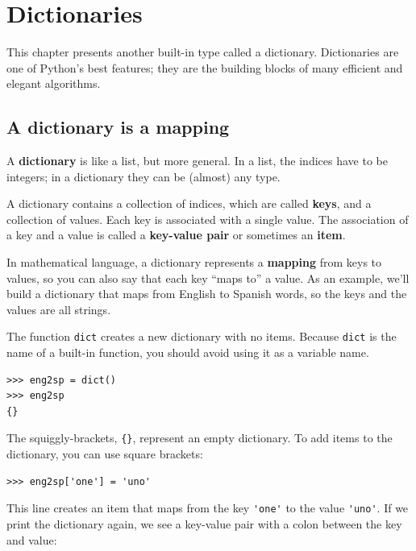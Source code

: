 \documentclass[10pt]{book}
\begin{document}
\chapter{Dictionaries}

This chapter presents another built-in type called a dictionary.
Dictionaries are one of Python's best features; they are the
building blocks of many efficient and elegant algorithms.


\section{A dictionary is a mapping}

A {\bf dictionary} is like a list, but more general.  In a list,
the indices have to be integers; in a dictionary they can
be (almost) any type.

A dictionary contains a collection of indices, which are called {\bf
  keys}, and a collection of values.  Each key is associated with a
single value.  The association of a key and a value is called a {\bf
  key-value pair} or sometimes an {\bf item}.  

In mathematical language, a dictionary represents a {\bf mapping}
from keys to values, so you can also say that each key
``maps to'' a value.
As an example, we'll build a dictionary that maps from English
to Spanish words, so the keys and the values are all strings.

The function {\tt dict} creates a new dictionary with no items.
Because {\tt dict} is the name of a built-in function, you
should avoid using it as a variable name.

\begin{verbatim}
>>> eng2sp = dict()
>>> eng2sp
{}
\end{verbatim}

The squiggly-brackets, \verb"{}", represent an empty dictionary.
To add items to the dictionary, you can use square brackets:

\begin{verbatim}
>>> eng2sp['one'] = 'uno'
\end{verbatim}
%
This line creates an item that maps from the key
\verb"'one'" to the value \verb"'uno'".  If we print the
dictionary again, we see a key-value pair with a colon
between the key and value:
\end{document}
